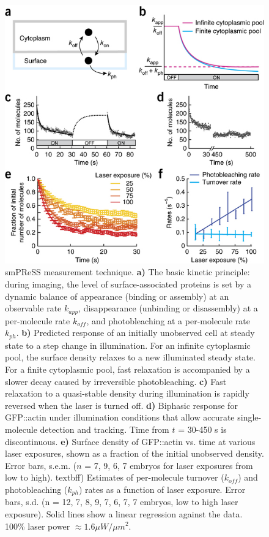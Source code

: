 \begin{figure}[H]
	\centering
	\includegraphics[width=0.8\hsize]{nmeth/nmeth.jpg}
	\caption{\label{fig:smpress} smPReSS measurement technique.  \textbf{a)}  The basic kinetic principle: during imaging, the level of surface-associated proteins is set by a dynamic balance of appearance (binding or assembly) at an observable rate $k_{app}$, disappearance (unbinding or disassembly) at a per-molecule rate $k_{off}$, and photobleaching at a per-molecule rate $k_{ph}$.  \textbf{b)} Predicted response of an initially unobserved cell at steady state to a step change in illumination. For an infinite cytoplasmic pool, the surface density relaxes to a new illuminated steady state. For a finite cytoplasmic pool, fast relaxation is accompanied by a slower decay caused by irreversible photobleaching. \textbf{c)} Fast relaxation to a quasi-stable density during illumination is rapidly reversed when the laser is turned off. \textbf{d)}  Biphasic response for GFP::actin under illumination conditions that allow accurate single-molecule detection and tracking. Time from $t$ = 30-450 s is discontinuous. \textbf{e)} Surface density of GFP::actin vs. time at various laser exposures, shown as a fraction of the initial unobserved density. Error bars, s.e.m. ($n$ = 7, 9, 6, 7 embryos for laser exposures from low to high). textbf{f)} Estimates of per-molecule turnover ($k_{off}$) and photobleaching ($k_{ph}$) rates as a function of laser exposure. Error bars, s.d. (n = 12, 7, 8, 9, 7, 6, 7, 7 embryos, low to high laser exposure). Solid lines show a linear regression against the data. 100\% laser power $\approx 1.6 \mu W/\mu m^2$.} 
	
\end{figure}

